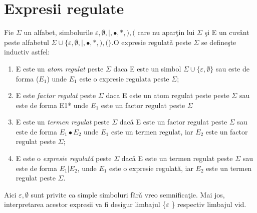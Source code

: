 \section{Expresii regulate}
Fie $\Sigma$ un alfabet, simbolurile $\varepsilon,\emptyset,|,\bullet,*,),($ care nu apar\c tin lui $\Sigma$ \c si E un cuv\^ ant peste alfabetul $\Sigma \cup \{\varepsilon,\emptyset,|,\bullet,*,),( \}$.O expresie regulat\v a peste $\Sigma$ se define\c ste inductiv astfel: \\
\begin{enumerate}
\item {
E este un \textit{atom regulat} peste $\Sigma$ daca E este un simbol $\Sigma \cup \{ \varepsilon,\emptyset \}$ sau este de forma ($E_{1}$) unde $E_{1}$ este o expresie regulata peste $\Sigma$;
}
\item{E este \textit{factor regulat} peste $\Sigma$ daca E este un atom regulat peste peste $\Sigma$ sau este de forma E1* unde $E_{1}$ este un factor regulat peste $\Sigma$}

\item{
E este un \textit{ termen regulat} peste $\Sigma$ dac\v a
E este un factor regulat peste $\Sigma$
sau este de forma $E_{1}\bullet E_{2}$
unde $E_{1}$ este un termen regulat, iar $E_{2}$ este un factor regulat peste $\Sigma$; 
}
\item{
E este o \textit{expresie regulat\v a} peste $\Sigma$ dac\v a E este un termen regulat peste $\Sigma$ sau este de forma $E_{1}| E_{2}$, unde $E_{1}$ este o expresie regulată, iar $E_{2}$ este un termen regulat peste
$\Sigma$. 
}
\end{enumerate}
Aici $\varepsilon,\emptyset$ sunt privite ca simple simboluri f\v ar\v a vreo semnifica\c tie. Mai jos, interpretarea acestor expresii va fi desigur limbajul \{$\varepsilon$ \} respectiv limbajul vid. 
